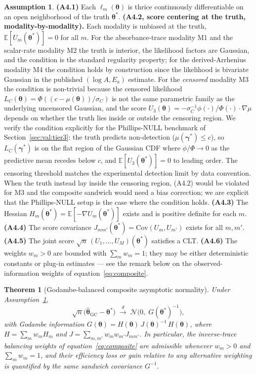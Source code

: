\documentclass[12pt]{article}
\theoremstyle{plain}
\newtheorem{theorem}{Theorem}
\theoremstyle{definition}
\newtheorem{assumption}{Assumption}
\theoremstyle{remark}
\newcommand{\E}{\mathbb{E}}
\begin{document}
\begin{assumption}\label{ass:thm4}
\textbf{(A4.1)} Each $\ell_m(\boldsymbol\theta)$ is thrice continuously
differentiable on an open neighborhood of the truth
$\boldsymbol\theta^*$.
\textbf{(A4.2, score centering at the truth, modality-by-modality).}  Each
modality is unbiased at the truth, $\E[U_m(\boldsymbol\theta^*)]=0$ for
all $m$.  For the absorbance-trace modality M1 and the scalar-rate
modality M2 the truth is interior, the likelihood factors are Gaussian, and
the condition is the standard regularity property; for the
derived-Arrhenius modality M4 the condition holds by construction since the
likelihood is bivariate Gaussian in the published $(\log A, E_a)$
estimate.  For the \emph{censored} modality M3 the condition is non-trivial
because the censored likelihood
$L_C(\boldsymbol\theta)=\Phi((c-\mu(\boldsymbol\theta))/\sigma_C)$ is not
the same parametric family as the underlying uncensored Gaussian, and the
score
$U_3(\boldsymbol\theta)=-\sigma_C^{-1}\phi(\cdot)/\Phi(\cdot)\cdot\nabla\mu$
depends on whether the truth lies inside or outside the censoring region.
We verify the condition explicitly for the Phillips-NULL benchmark of
Section~\ref{sec:val:tier3}: the truth predicts non-detection
($\mu(\boldsymbol\gamma^*)\le c$), so $L_C(\boldsymbol\gamma^*)$ is on the
flat region of the Gaussian CDF where $\phi/\Phi\to 0$ as the predictive
mean recedes below $c$, and $\E[U_3(\boldsymbol\theta^*)]=0$ to leading
order.  The censoring threshold matches the experimental detection limit by
data convention.  When the truth instead lay inside the censoring region,
(A4.2) would be violated for M3 and the composite sandwich would need a
bias correction; we are explicit that the Phillips-NULL setup is the case
where the condition holds.
\textbf{(A4.3)} The Hessian $H_m(\boldsymbol\theta^*)=
\E[-\nabla U_m(\boldsymbol\theta^*)]$ exists and is positive definite
for each $m$.
\textbf{(A4.4)} The score covariance
$J_{mm'}(\boldsymbol\theta^*)=\mathrm{Cov}(U_m,U_{m'})$ exists for all
$m,m'$.
\textbf{(A4.5)} The joint score
$\sqrt{n}\,(U_1,\ldots,U_M)(\boldsymbol\theta^*)$ satisfies a CLT.
\textbf{(A4.6)} The weights $w_m>0$ are bounded with $\sum_m w_m=1$;
they may be either deterministic constants or plug-in estimates --- see
the remark below on the observed-information weights of
equation~\eqref{eq:composite}.
\end{assumption}

\begin{theorem}[Godambe-balanced composite asymptotic normality]\label{thm:composite}
Under Assumption~\ref{ass:thm4},
\[
   \sqrt{n}\bigl(\hat{\boldsymbol\theta}_{\mathrm{GC}}-\boldsymbol\theta^*\bigr)
    \;\xrightarrow{d}\;
    \mathcal{N}\!\bigl(0,\;G(\boldsymbol\theta^*)^{-1}\bigr),
\]
with Godambe information
$G(\boldsymbol\theta) = H(\boldsymbol\theta)\,J(\boldsymbol\theta)^{-1}\,
H(\boldsymbol\theta)$, where
$H=\sum_m w_m H_m$ and $J=\sum_{m,m'}w_m w_{m'} J_{mm'}$.  In particular,
the inverse-trace balancing weights of equation~\eqref{eq:composite} are
admissible whenever $w_m>0$ and $\sum_m w_m=1$, and their efficiency loss
or gain relative to any alternative weighting is quantified by the same
sandwich covariance $G^{-1}$.
\end{theorem}
\end{document}
